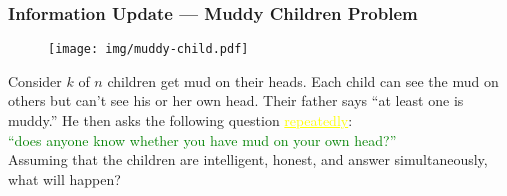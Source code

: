 \documentclass[UTF8,11pt,colorlinks,compress,openany]{beamer}%
\begin{document}
\begin{frame}\frametitle{Information Update --- Muddy Children Problem}
			\begin{figure}
				\texttt{[image: img/muddy-child.pdf]}
			\end{figure}\vspace{-1ex}
	\begin{problem}
		Consider $k$ of $n$ children get mud on their heads. Each child can see the mud on others but can't see his or her own head. Their father says ``at least one is muddy.'' He then asks the following question \textcolor{yellow}{\underline{repeatedly}}:\\
		\textcolor{green}{``does anyone know whether you have mud on your own head?''}\\
		Assuming that the children are intelligent, honest, and answer simultaneously, what will happen?
	\end{problem}
\end{frame}
\end{document}
